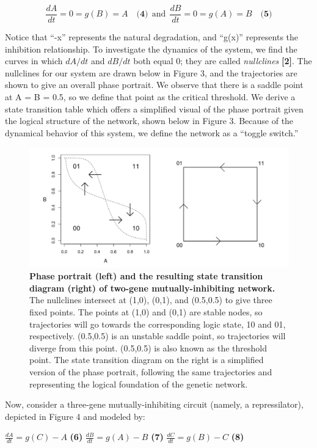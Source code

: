 \documentclass[11pt]{article}
\begin{document}
\[ \frac{dA}{dt}= 0 = g(B) = A \quad \textbf{(4)} \ \ \textrm{and}
\ \ \frac{dB}{dt}= 0 = g(A) = B \quad \textbf{(5)} \]

Notice that “-x” represents the natural degradation, and “g(x)” represents the inhibition relationship. To investigate the dynamics of the system, we find the curves in which $dA/dt$ and $dB/dt$ both equal 0; they are called \textit{nullclines} \textbf{[2]}. The nullclines for our system are drawn below in Figure 3, and the trajectories are shown to give an overall phase portrait. We observe that there is a saddle point at A = B = 0.5, so we define that point as the critical threshold. We derive a state transition table which offers a simplified visual of the phase portrait given the logical structure of the network, shown below in Figure 3. Because of the dynamical behavior of this system, we define the network as a “toggle switch.”

\begin{figure}[H]
\centering
\includegraphics[scale=0.4]{figure3}
\caption{\textbf{Phase portrait (left) and the resulting state transition diagram (right) of two-gene mutually-inhibiting network.} The nullclines intersect at (1,0), (0,1), and (0.5,0.5) to give three fixed points. The points at (1,0) and (0,1) are stable nodes, so trajectories will go towards the corresponding logic state, 10 and 01, respectively. (0.5,0.5) is an unstable saddle point, so trajectories will diverge from this point. (0.5,0.5) is also known as the threshold point. The state transition diagram on the right is a simplified version of the phase portrait, following the same trajectories and representing the logical foundation of the genetic network.}
\end{figure}

Now, consider a three-gene mutually-inhibiting circuit (namely, a repressilator), depicted in Figure 4 and modeled by: 

\begin{center}
\( \frac{dA}{dt} = g(C) - A \)  \quad \textbf{(6)} \linebreak
\( \frac{dB}{dt} = g(A) - B \)  \quad \textbf{(7)} \linebreak
\( \frac{dC}{dt} = g(B) - C \)  \quad \textbf{(8)}
\end{center}
\end{document}
